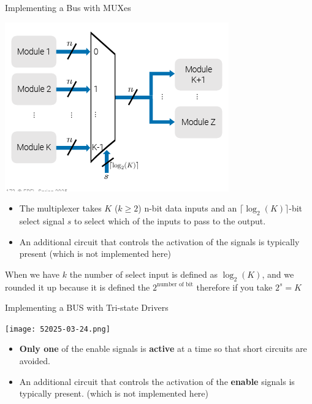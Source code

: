\begin{parag}{Implementing a Bus with MUXes}
    \begin{center}
        \includegraphics[scale=0.7]{42025-03-24.png}
    \end{center}
    \begin{itemize}
        \item The multiplexer takes $K$ ($k \geq 2$) n-bit data inputs and an $ \lceil \log_2 (K) \rceil$-bit select signal $s$ to select which of the inputs to pass to the output.
        \item An additional circuit that controls the activation of the  signals is typically present (which is not implemented here)
    \end{itemize}
    \begin{framedremark}
        When we have $k$ the number of select input is defined as $ \log_2(K)$,  and we rounded it up because it is defined the $2^{ \text{number of bit}}$ therefore if you take $2^{s} = K$ 
    \end{framedremark}
    
\end{parag}
\begin{parag}{Implementing a BUS with Tri-state Drivers}
    \begin{center}
        \texttt{[image: 52025-03-24.png]}
    \end{center}
    \begin{itemize}
        \item \textbf{Only one} of the enable signals is \textbf{active} at a time so that short circuits are avoided.
        \item An additional circuit that controls the activation of the \textbf{enable} signals is typically present. (which is not implemented here)
    \end{itemize}
   
\end{parag}
